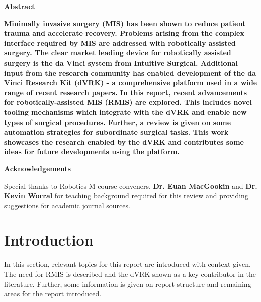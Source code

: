 \documentclass[english]{sobraep}
\begin{document}
\setcounter{page}{1}
\thispagestyle{plain}
\begin{center}
    
    \textbf{Abstract}
\end{center}
\textbf{Minimally invasive surgery (MIS) has been shown to reduce patient trauma and accelerate recovery. Problems arising from the complex interface required by MIS are addressed with robotically assisted surgery. The clear market leading device for robotically assisted surgery is the da Vinci system from Intuitive Surgical. Additional input from the research community has enabled development of the da Vinci Research Kit (dVRK) - a comprehensive platform used in a wide range of recent research papers. In this report, recent advancements for robotically-assisted MIS (RMIS) are explored. This includes novel tooling mechanisms which integrate with the dVRK and enable new types of surgical procedures. Further, a review is given on some automation strategies for subordinate surgical tasks. This work showcases the research enabled by the dVRK and contributes some ideas for future developments using the platform.}

\begin{center}
    \textbf{Acknowledgements}
\end{center}
Special thanks to Robotics M course conveners, \textbf{Dr. Euan MacGookin} and \textbf{Dr. Kevin Worral} for teaching background required for this review and providing suggestions for academic journal sources. 
\section{Introduction}
In this section, relevant topics for this report are introduced with context given. The need for RMIS is described and the dVRK shown as a key contributor in the literature. Further, some information is given on report structure and remaining areas for the report introduced. 
\end{document}
